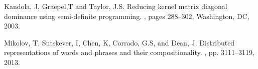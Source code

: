 \begin{thebibliography}{99}
 Kandola, J, Graepel,T and Taylor, J.S.
\newblock  Reducing kernel matrix diagonal dominance using semi-definite
programming. 
, pages 288–302, Washington, DC, 2003.

 Mikolov, T, Sutskever, I, Chen, K, Corrado, G.S, and Dean, J. \newblock Distributed representations of words and phrases and their compositionality. 
, pp. 3111–3119, 2013.


\end{thebibliography}
